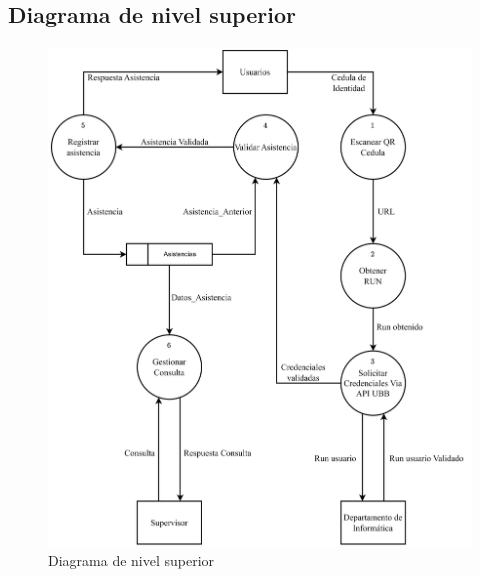 \documentclass{templateReport}
\begin{document}
\subsection{Diagrama de nivel superior}
\begin{figure}[H]
    \centering
    \includegraphics[scale=0.1]{img/TS-SI-Nivel Superior.drawio.png}
    \caption{Diagrama de nivel superior}
    \label{fig:diagramaNivelSuperior}
\end{figure}
\end{document}
